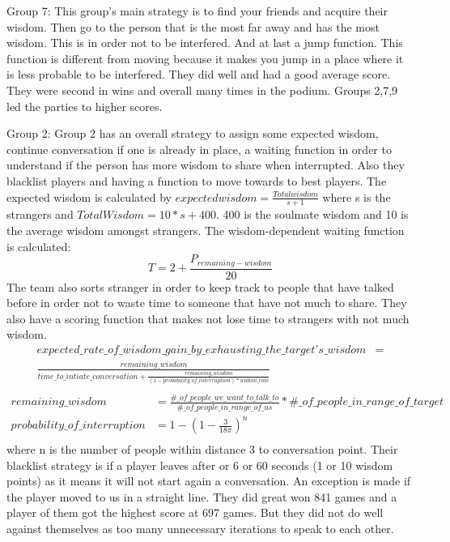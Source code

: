 Group 7:
This group's main strategy is to find your friends and acquire their wisdom. Then
go to the person that is the most far away and has the most wisdom. This is in 
order not to be interfered. And at last a jump function. This function is 
different from moving because it makes you jump in a place where it is less 
probable to be interfered. They did well and had a good average score. They were
second in wins and overall many times in the podium. Groups 2,7,9 led the parties 
to higher scores.

Group 2:
Group 2 has an overall strategy to assign some expected wisdom, continue conversation
if one is already in place, a waiting function in order to understand if the
person has more wisdom to share when interrupted. Also they blacklist players
and having a function to move towards to best players. The expected wisdom is
calculated by $expected wisdom = \frac{Total wisdom}{s+1}$ where s is the strangers
and $Total Wisdom = 10*s + 400$. 400 is the soulmate wisdom and 10 is the average
wisdom amongst strangers. The wisdom-dependent waiting function is calculated:
\begin{equation*}
T = 2 + \frac{P_{remaining-wisdom}}{20}
\end{equation*}
The team also sorts stranger in order to keep track to people that have talked 
before in order not to waste time to someone that have not much to share. They 
also have a scoring function that makes not lose time to strangers with not much
wisdom.
\begin{equation*}
\begin{aligned}
expected\_rate\_of\_wisdom\_gain\_by\_exhausting\_the\_target’s\_wisdom &=\\
 \frac{remaining\_wisdom}{time\_to\_intiate\_conversation + \frac{remaining\_wisdom}{(1- probability\_of\_interruption)* widom\_rate}} \\
\end{aligned}
\end{equation*}
\begin{equation*}
\begin{aligned}
remaining\_wisdom &= \frac{\#\_of\_people\_we\_want\_to\_talk\_to}{\#\_of\_people\_in\_range\_of\_us}*\#\_of\_people\_in\_range\_of\_target \\
probability\_of\_interruption &= 1 - (1-\frac{3}{18\pi})^n \\
\end{aligned}
\end{equation*}
where n is the number of people within distance 3 to conversation point. Their 
blacklist strategy is if a player leaves after or 6 or 60 seconds (1 or 10 wisdom 
points) as it means it will not start again a conversation. An exception is made
if the player moved to us in a straight line. They did great won 841 games and
a player of them got the highest score at 697 games. But they did not do well
against themselves as too many unnecessary iterations to speak to each other.

